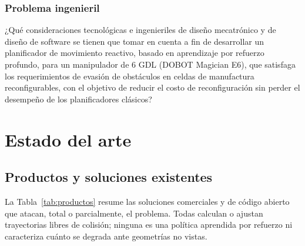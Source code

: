 \documentclass[11pt,a4paper,twoside]{article}
\begin{document}
\subsubsection{Problema ingenieril}

¿Qué consideraciones tecnológicas e ingenieriles de diseño mecatrónico y de diseño de software se tienen que tomar en cuenta a fin de desarrollar un planificador de movimiento reactivo, basado en aprendizaje por refuerzo profundo, para un manipulador de 6 GDL (DOBOT Magician E6), que satisfaga los requerimientos de evasión de obstáculos en celdas de manufactura reconfigurables, con el objetivo de reducir el costo de reconfiguración sin perder el desempeño de los planificadores clásicos?

\section{Estado del arte}

\subsection{Productos y soluciones existentes}

La Tabla~\ref{tab:productos} resume las soluciones comerciales y de código abierto que atacan, total o parcialmente, el problema. Todas calculan o ajustan trayectorias libres de colisión; ninguna es una política aprendida por refuerzo ni caracteriza cuánto se degrada ante geometrías no vistas.
\end{document}
